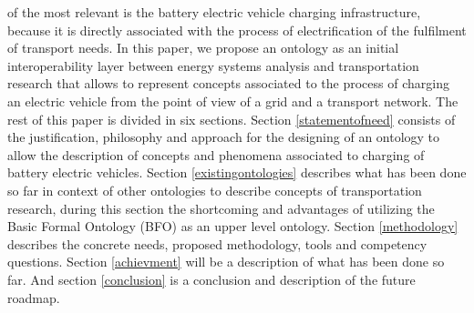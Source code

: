 of the most relevant is the battery electric vehicle charging infrastructure,
because it is directly associated with the process of electrification of the
fulfilment of transport needs. In this paper, we propose an ontology as an
initial interoperability layer between energy systems analysis and
transportation research that allows to represent concepts associated to the
process of charging an electric vehicle from the point of view of a grid and a
transport network. The rest of this paper is divided in six sections. Section
\ref{statementofneed} consists of the justification, philosophy and approach
for the designing of an ontology to allow the description of concepts and
phenomena associated to charging of battery electric vehicles. Section
\ref{existingontologies} describes what has been done so far in context of
other ontologies to describe concepts of transportation research, during this
section the shortcoming and advantages of utilizing the Basic Formal Ontology
(BFO) \cite{Arp.2015} as an upper level ontology. Section \ref{methodology}
describes the concrete needs, proposed methodology, tools and competency
questions. Section \ref{achievment} will be a description of what has been done
so far. And section \ref{conclusion} is a conclusion and description of the
future roadmap.

